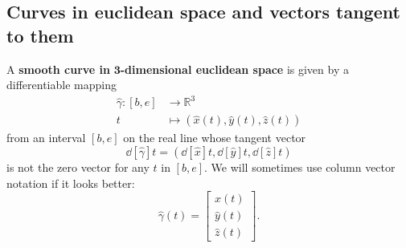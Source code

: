 \documentclass[newpage,hints,handout,nooutcomes,noauthor,12pt]{ximera}
\begin{document}


\subsection{Curves in euclidean space and vectors tangent to them}

\begin{definition}
A \textbf{smooth curve in }$\mathbf{3}$\textbf{-dimensional euclidean space}
is given by a differentiable mapping%
\begin{align*}
\hat{\gamma}:[b,e] &\rightarrow \mathbb{R}^{3}\\
t &\mapsto (\hat{x}(t), \hat{y}(t), \hat{z}(t))
\end{align*}
from an interval $[b,e]$ on the real line whose tangent vector
\[
\dd[\hat{\gamma}]{t} =\left(
  \dd[\hat{x}]{t},
  \dd[\hat{y}]{t},
  \dd[\hat{z}]{t}
\right)
\]
is not the zero vector for any $t$ in $[b,e]$.  We will sometimes use column
vector notation if it looks better:%
\[
\hat{\gamma}(t) = \begin{bmatrix}
  \hat{x}(t)\\
  \hat{y}(t)\\
  \hat{z}(t)
\end{bmatrix}.
\]
\end{definition}
\end{document}
